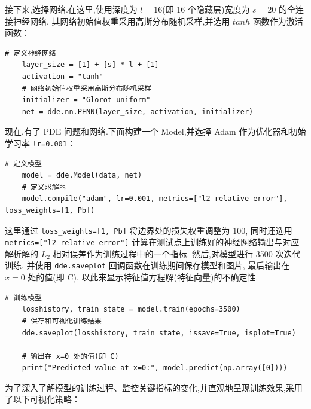\documentclass{Sichuan Normal University}
\begin{document}
接下来,选择网络.在这里,使用深度为 $l=16$(即 16 个隐藏层)宽度为 $s=20$ 的全连接神经网络, 其网络初始值权重采用高斯分布随机采样,并选用 $tanh$ 函数作为激活函数：
\begin{lstlisting}[style=python,basicstyle=\footnotesize\fontspec{Courier New},]  
    # 定义神经网络
    layer_size = [1] + [s] * l + [1]
    activation = "tanh"
    # 网络初始值权重采用高斯分布随机采样
    initializer = "Glorot uniform"
    net = dde.nn.PFNN(layer_size, activation, initializer)
\end{lstlisting}
现在,有了 PDE 问题和网络.下面构建一个 Model,并选择 Adam 作为优化器和初始学习率 \texttt{lr=0.001}：
\begin{lstlisting}[style=python,basicstyle=\footnotesize\fontspec{Courier New},]  
    # 定义模型
    model = dde.Model(data, net)
    # 定义求解器
    model.compile("adam", lr=0.001, metrics=["l2 relative error"], loss_weights=[1, Pb])
\end{lstlisting}
这里通过 \texttt{loss\_weights=[1, Pb]} 将边界处的损失权重调整为 $100$, 同时还选用 \texttt{metrics=["l2 relative error"]} 计算在测试点上训练好的神经网络输出与对应解析解的 $L_2$ 相对误差作为训练过程中的一个指标.
然后,对模型进行 3500 次迭代训练, 并使用 \texttt{dde.saveplot} 回调函数在训练期间保存模型和图片, 最后输出在 $x=0$ 处的值(即 C), 以此来显示特征值方程解(特征向量)的不确定性.
\begin{lstlisting}[style=python,basicstyle=\footnotesize\fontspec{Courier New},]  
    # 训练模型
    losshistory, train_state = model.train(epochs=3500)
    # 保存和可视化训练结果
    dde.saveplot(losshistory, train_state, issave=True, isplot=True)

    # 输出在 x=0 处的值(即 C)
    print("Predicted value at x=0:", model.predict(np.array([0])))
\end{lstlisting}

为了深入了解模型的训练过程、监控关键指标的变化,并直观地呈现训练效果,采用了以下可视化策略：
\end{document}
